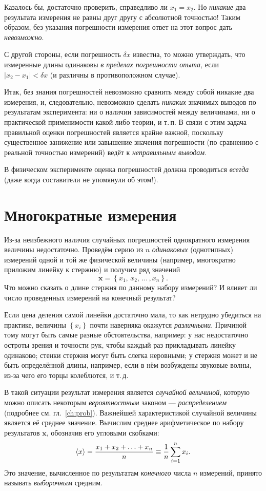 Казалось бы,
достаточно проверить, справедливо ли $x_{1}=x_{2}$. Но \emph{никакие}
два результата измерения не равны друг другу с абсолютной точностью! Таким
образом, без указания погрешности измерения ответ на этот вопрос дать
\emph{невозможно}.

С другой стороны, если погрешность $\delta x$ известна, то можно
утверждать, что измеренные длины одинаковы
\emph{в пределах погрешности опыта}, если $|x_{2}-x_{1}|<\delta x$
(и различны в противоположном случае).

Итак, без знания погрешностей невозможно сравнить между собой никакие
два измерения, и, следовательно, невозможно сделать \emph{никаких}
значимых выводов по результатам эксперимента: ни о наличии зависимостей
между величинами, ни о практической применимости какой-либо теории,
и т.\,п. В связи с этим задача правильной оценки погрешностей является крайне
важной, поскольку существенное занижение или завышение значения погрешности
(по сравнению с реальной точностью измерений) ведёт к \emph{неправильным выводам}.

В физическом эксперименте оценка погрешностей должна проводиться \emph{всегда}
(даже когда составители  не упомянули об этом!).

\section{Многократные измерения}

Из-за неизбежного наличия случайных погрешностей однократного измерения
величины недостаточно. Проведём серию из $n$ \emph{одинаковых} (однотипных) измерений одной
и той же физической величины (например, многократно приложим линейку к стержню) и получим
ряд значений
\[
\mathbf{x} = \left\{ x_{1},\,x_{2},\,\ldots\,,x_{n}\right\} .
\]
Что можно сказать о длине стержня по данному набору измерений?
И влияет ли число проведенных измерений на конечный результат?

Если цена деления самой линейки достаточно мала, то как нетрудно убедиться
на практике, величины $\left\{ x_{i}\right\}$ почти наверняка окажутся
\emph{различными}. Причиной тому могут быть
самые разные обстоятельства, например: у нас недостаточно остроты
зрения и точности рук, чтобы каждый раз прикладывать линейку одинаково;
стенки стержня могут быть слегка неровными; у стержня может и не быть
определённой длины, например, если в нём возбуждены звуковые волны,
из-за чего его торцы колеблются, и т.\,д.

В такой ситуации результат измерения является \emph{случайной величиной}, 
которую можно описать некоторым \emph{вероятностным} законом ---
\emph{распределением} (подробнее см. гл.~\ref{ch:prob}). Важнейшей характеристикой
случайной величины является её среднее значение.
Вычислим среднее арифметическое по набору результатов $\mathbf{x}$,
обозначив его угловыми скобками:
\begin{equation}
 \left<x\right>=\frac{x_{1}+x_{2}+\ldots+x_{n}}{n}\equiv\frac{1}{n}\sum\limits
_{i=1}^{n}x_{i}\label{eq:average}.
\end{equation}
Это значение, вычисленное по результатам \emph{конечного} числа $n$ измерений,
принято называть \emph{выборочным} средним.

